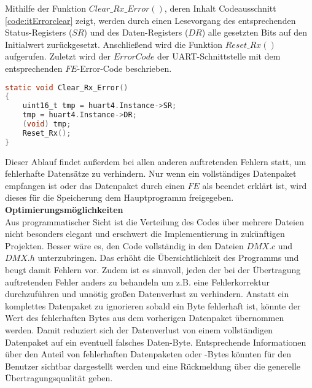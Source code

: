Mithilfe der Funktion $Clear\_Rx\_Error()$, deren Inhalt Codeausschnitt \ref{code:itErrorclear} zeigt, werden durch einen Lesevorgang des entsprechenden Status-Registers ($SR$) und des Daten-Registers ($DR$) alle gesetzten Bits auf den Initialwert zurückgesetzt. Anschließend wird die Funktion $Reset\_Rx()$ aufgerufen. Zuletzt wird der $ErrorCode$ der UART-Schnittstelle mit dem entsprechenden $FE$-Error-Code beschrieben. 
\begin{lstlisting}[caption = stm32f4xx\_it.c: UART Clear\_Rx\_Error(),
	label = code:itErrorclear, 
	language = C, 
	firstnumber = 426]
static void Clear_Rx_Error()
{
	uint16_t tmp = huart4.Instance->SR;
	tmp = huart4.Instance->DR;
	(void) tmp;
	Reset_Rx();
}
\end{lstlisting}
Dieser Ablauf findet außerdem bei allen anderen auftretenden Fehlern statt, um fehlerhafte Datensätze zu verhindern. Nur wenn ein vollständiges Datenpaket empfangen ist oder das Datenpaket durch einen $FE$ als beendet erklärt ist, wird dieses für die Speicherung dem Hauptprogramm freigegeben.\\
\newline
\textbf{Optimierungsmöglichkeiten}\\
Aus programmatischer Sicht ist die Verteilung des Codes über mehrere Dateien nicht besonders elegant und erschwert die Implementierung in zukünftigen Projekten. Besser wäre es, den Code vollständig in den Dateien $DMX.c$ und $DMX.h$ unterzubringen. Das erhöht die Übersichtlichkeit des Programms und beugt damit Fehlern vor. Zudem ist es sinnvoll, jeden der bei der Übertragung auftretenden Fehler anders zu behandeln um z.B. eine Fehlerkorrektur durchzuführen und unnötig großen Datenverlust zu verhindern. Anstatt ein komplettes Datenpaket zu ignorieren sobald ein Byte fehlerhaft ist, könnte der Wert des fehlerhaften Bytes aus dem vorherigen Datenpaket übernommen werden. Damit reduziert sich der Datenverlust von einem vollständigen Datenpaket auf ein eventuell falsches Daten-Byte. Entsprechende Informationen über den Anteil von fehlerhaften Datenpaketen oder -Bytes könnten für den Benutzer sichtbar dargestellt werden und eine Rückmeldung über die generelle Übertragungsqualität geben.